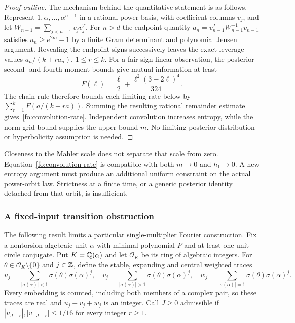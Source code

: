 \begin{proof}[Proof outline]
The mechanism behind the quantitative statement is as follows.
Represent $1,\alpha,\ldots,\alpha^{n-1}$ in a rational power basis, with coefficient columns $v_j$, and let $W_{n-1}=\sum_{j<n-1}v_jv_j^T$.
For $n>d$ the endpoint quantity $a_n=v_{n-1}^TW_{n-1}^{-1}v_{n-1}$ satisfies $a_n\ge e^{2m}-1$ by a finite Gram determinant and polynomial Jensen argument.
Revealing the endpoint signs successively leaves the exact leverage values $a_n/(k+ra_n)$, $1\le r\le k$.
For a fair-sign linear observation, the posterior second- and fourth-moment bounds give mutual information at least
\[
 F(\ell)=\frac\ell2+\frac{\ell^2(3-2\ell)^4}{324}.
\]
The chain rule therefore bounds each limiting rate below by $\sum_{r=1}^kF(a/(k+ra))$.
Summing the resulting rational remainder estimate gives~\eqref{fo:convolution-rate}.
Independent convolution increases entropy, while the norm-grid bound supplies the upper bound $m$.
No limiting posterior distribution or hyperbolicity assumption is needed.
\end{proof}

\begin{remark}
Closeness to the Mahler scale does not separate that scale from zero.
Equation~\eqref{fo:convolution-rate} is compatible with both $m\to0$ and $h_1\to0$.
A new entropy argument must produce an additional uniform constraint on the actual power-orbit law.
Strictness at a finite time, or a generic posterior identity detached from that orbit, is insufficient.
\end{remark}
\subsubsection{A fixed-input transition obstruction}
\label{fo:transition}

The following result limits a particular single-multiplier Fourier construction.
Fix a nontorsion algebraic unit $\alpha$ with minimal polynomial $P$ and at least one unit-circle conjugate.
Put $K=\mathbb Q(\alpha)$ and let $\mathcal O_K$ be its ring of algebraic integers.
For $\theta\in\mathcal O_K\setminus\{0\}$ and $j\in\mathbb Z$, define the stable, expanding and central weighted traces
\[
 u_j=\sum_{|\sigma(\alpha)|<1}\sigma(\theta)\sigma(\alpha)^j,\quad
 v_j=\sum_{|\sigma(\alpha)|>1}\sigma(\theta)\sigma(\alpha)^j,\quad
 w_j=\sum_{|\sigma(\alpha)|=1}\sigma(\theta)\sigma(\alpha)^j.
\]
Every embedding is counted, including both members of a complex pair, so these traces are real and $u_j+v_j+w_j$ is an integer.
Call $J\ge0$ admissible if $|u_{J+r}|,|v_{-J-r}|\le1/16$ for every integer $r\ge1$.

